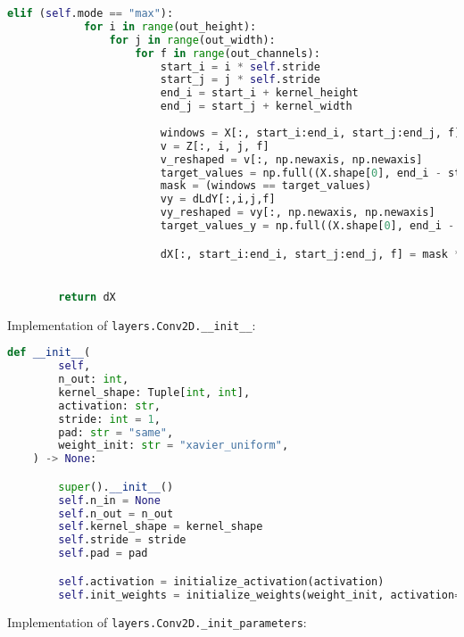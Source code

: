 \begin{lstlisting}[language=Python]
        elif (self.mode == "max"):
            for i in range(out_height):
                for j in range(out_width):
                    for f in range(out_channels):
                        start_i = i * self.stride
                        start_j = j * self.stride
                        end_i = start_i + kernel_height
                        end_j = start_j + kernel_width
                        
                        windows = X[:, start_i:end_i, start_j:end_j, f]
                        v = Z[:, i, j, f]
                        v_reshaped = v[:, np.newaxis, np.newaxis]
                        target_values = np.full((X.shape[0], end_i - start_i, end_j - start_j), v_reshaped)
                        mask = (windows == target_values)
                        vy = dLdY[:,i,j,f]
                        vy_reshaped = vy[:, np.newaxis, np.newaxis]
                        target_values_y = np.full((X.shape[0], end_i - start_i, end_j - start_j), vy_reshaped)

                        dX[:, start_i:end_i, start_j:end_j, f] = mask * target_values_y


        return dX

\end{lstlisting}

Implementation of \texttt{layers.Conv2D.__init__}:

\begin{lstlisting}[language=Python]
    def __init__(
        self,
        n_out: int,
        kernel_shape: Tuple[int, int],
        activation: str,
        stride: int = 1,
        pad: str = "same",
        weight_init: str = "xavier_uniform",
    ) -> None:

        super().__init__()
        self.n_in = None
        self.n_out = n_out
        self.kernel_shape = kernel_shape
        self.stride = stride
        self.pad = pad

        self.activation = initialize_activation(activation)
        self.init_weights = initialize_weights(weight_init, activation=activation)

\end{lstlisting}

Implementation of \texttt{layers.Conv2D._init_parameters}:

